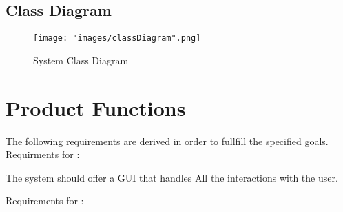 \subsection{Class Diagram}
\begin{figure}[H]
\begin{center}
\texttt{[image: "images/classDiagram".png]}
\caption{System Class Diagram}
\end{center}
\end{figure}

\section{Product Functions}

The following requirements are derived in order to fullfill the specified goals.
\\

Requirments for :

\item The system should offer a GUI that handles All the interactions with the user.

Requirements for :

